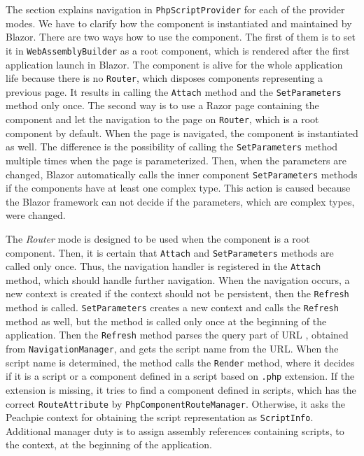 The section explains navigation in \texttt{PhpScriptProvider} for each of the provider modes.
We have to clarify how the component is instantiated and maintained by Blazor.
There are two ways how to use the component.
The first of them is to set it in \texttt{WebAssemblyBuilder} as a root component,
which is rendered after the first application launch in Blazor.
The component is alive for the whole application life because there is no \texttt{Router}, which disposes components representing a previous page. 
It results in calling the \texttt{Attach} method and the \texttt{SetParameters} method only once.
The second way is to use a Razor page containing the component and let the navigation to the page on \texttt{Router}, which is a root component by default.
When the page is navigated, the component is instantiated as well.
The difference is the possibility of calling the \texttt{SetParameters} method multiple times when the page is parameterized.
Then, when the parameters are changed, Blazor automatically calls the inner component \texttt{SetParameters} methods if the components have at least one complex type. 
This action is caused because the Blazor framework can not decide if the parameters, which are complex types, were changed.
\par
The \textit{Router} mode is designed to be used when the component is a root component.
Then, it is certain that \texttt{Attach} and \texttt{SetParameters} methods are called only once.
Thus, the navigation handler is registered in the \texttt{Attach} method, which should handle further navigation.
When the navigation occurs, a new context is created if the context should not be persistent, then the \texttt{Refresh} method is called.
\texttt{SetParameters} creates a new context and calls the \texttt{Refresh} method as well, but the method is called only once at the beginning of the application.
Then the \texttt{Refresh} method parses the query part of URL \cite{online:querryStrings}, obtained from \texttt{NavigationManager}, and gets the script name from the URL.
When the script name is determined, the method calls the \texttt{Render} method, where it decides if it is a script or a component defined in a script based on \texttt{.php} extension.
If the extension is missing, it tries to find a component defined in scripts, which has the correct \texttt{RouteAttribute} by \texttt{PhpComponentRouteManager}.
Otherwise, it asks the Peachpie context for obtaining the script representation as \texttt{ScriptInfo}.
Additional manager duty is to assign assembly references containing scripts, to the context, at the beginning of the application.
